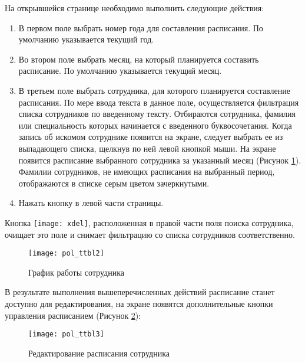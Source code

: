 {
На открывшейся странице необходимо выполнить следующие действия:
\begin{enumerate}
 \item В первом поле выбрать номер года для составления расписания. По умолчанию указывается текущий год.
 \item Во втором поле выбрать месяц, на который планируется составить расписание. По умолчанию указывается текущий месяц.
 \item В третьем поле выбрать сотрудника, для которого планируется составление расписания. По мере ввода текста в данное поле, осуществляется фильтрация списка сотрудников по введенному тексту. Отбираются сотрудника, фамилия или специальность которых начинается с введенного буквосочетания. Когда запись об искомом сотруднике появится на экране, следует выбрать ее из выпадающего списка, щелкнув по ней левой кнопкой мыши. На экране появится расписание выбранного сотрудника за указанный месяц (Рисунок \ref{img_pol_ttbl2}). Фамилии сотрудников, не имеющих расписания на выбранный период, отображаются в списке серым цветом зачеркнутыми.  
 \item Нажать кнопку  в левой части страницы. 
\end{enumerate}

 \begin{prim}
 Кнопка \texttt{[image: xdel]}, расположенная в правой части поля поиска сотрудника, очищает это поле и снимает фильтрацию со списка сотрудников соответственно.
 \end{prim}

\begin{figure}[ht]\centering
 \texttt{[image: pol\_ttbl2]}
 \caption{График работы сотрудника}
 \label{img_pol_ttbl2}
\end{figure}

В результате выполнения вышеперечисленных действий расписание станет доступно для редактирования, на экране появятся дополнительные кнопки управления расписанием (Рисунок \ref{img_pol_ttbl3}):

\begin{figure}[ht]\centering
 \texttt{[image: pol\_ttbl3]}
 \caption{Редактирование расписания сотрудника}
 \label{img_pol_ttbl3}
\end{figure}

}

